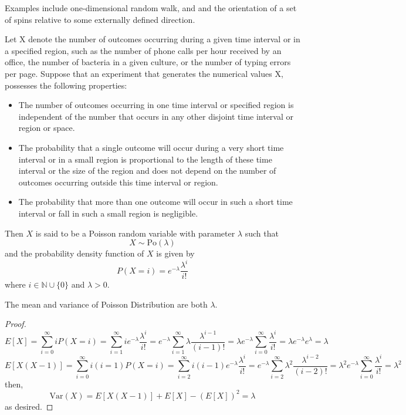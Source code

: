 \documentclass[a4paper]{article}
\begin{document}
\begin{Note}
Examples include one-dimensional random walk, and and the orientation of a set of spins relative to some externally defined direction.
\end{Note}
\begin{defi}
Let X denote the number of outcomes occurring during a given time interval or in a specified region, such as the number of phone calls per hour received by an office,  the number of bacteria in a given culture, or the number of typing errors per page.
Suppose that an experiment that generates the numerical values X, possesses the following properties:
\begin{itemize}
    \item The number of outcomes occurring in one time interval or specified region is independent of the number that  occurs in any other disjoint time interval or region or space.
    \item The probability that a single outcome will occur during a very short time interval or in a small region is proportional to the length of these time interval or the size of the region and does not depend on the number of outcomes occurring outside this time interval or region.
    \item The probability that more than one outcome will occur in such a short time interval or fall in such a small region is negligible.
\end{itemize}
Then $X$ is said to be a Poisson random variable with parameter $\lambda$ such that
$$X\sim\text{Po}(\lambda)$$
and the probability density function of $X$ is given by
$$P(X=i)=e^{-\lambda}\frac{\lambda^i}{i!}$$
where $i\in\mathbb{N}\cup\{0\}$ and $\lambda>0$.
\end{defi}
\begin{thm}
The mean and variance of Poisson Distribution are both $\lambda$.
\end{thm}
\begin{proof} 
$$E[X]=\sum_{i=0}^\infty iP(X=i)=\sum_{i=1}^\infty ie^{-\lambda}\frac{\lambda^i}{i!}=e^{-\lambda}\sum_{i=1}^\infty\lambda\frac{\lambda^{i-1}}{(i-1)!}=\lambda e^{-\lambda}\sum_{i=0}^\infty\frac{\lambda^i}{i!}=\lambda e^{-\lambda}e^{\lambda}=\lambda$$
$$E[X(X-1)]=\sum_{i=0}^\infty i(i=1)P(X=i)=\sum_{i=2}^\infty i(i-1)e^{-\lambda}\frac{\lambda^i}{i!}=e^{-\lambda}\sum_{i=2}^\infty\lambda^2\frac{\lambda^{i-2}}{(i-2)!}=\lambda^2e^{-\lambda}\sum_{i=0}^\infty\frac{\lambda^i}{i!}=\lambda^2$$
then,
$$\text{Var}(X)=E[X(X-1)]+E[X]-(E[X])^2=\lambda$$
as desired.
\end{proof}
\end{document}
